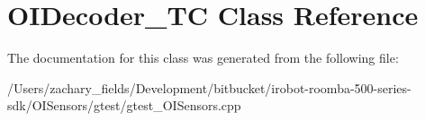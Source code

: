 \hypertarget{class_o_i_decoder___t_c}{\section{O\+I\+Decoder\+\_\+\+T\+C Class Reference}
\label{class_o_i_decoder___t_c}
}


The documentation for this class was generated from the following file\+:\begin{DoxyCompactItemize}
\item 
/\+Users/zachary\+\_\+fields/\+Development/bitbucket/irobot-\/roomba-\/500-\/series-\/sdk/\+O\+I\+Sensors/gtest/gtest\+\_\+\+O\+I\+Sensors.\+cpp\end{DoxyCompactItemize}
